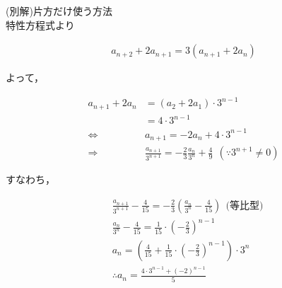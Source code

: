 \documentclass[autodetect-engine,ja=standard, 10.5pt, a4paper, titlepage]{bxjsarticle}
\begin{document}
\begin{enumerate}[1.]
        \baselineskip
        \noindent(別解)片方だけ使う方法 \\
        特性方程式より
          \begin{fleqn}[20pt]
            \begin{align*}
              a_{n+2} + 2a_{n+1} = 3(a_{n+1} + 2a_n)
            \end{align*}
          \end{fleqn}
        よって，
          \begin{fleqn}[20pt]
            \begin{align*}
              a_{n+1} + 2a_n
              &= (a_2 + 2a_1)\cdot 3^{n-1} \\
              &= 4\cdot3^{n-1} \\
              \Leftrightarrow & a_{n+1} = -2a_n + 4\cdot3^{n-1} \\
              \Rightarrow     & \frac{a_{n+1}}{3^{n+1}} = -\frac{2}{3}\frac{a_n}{3^n} + \frac{4}{9} \:\: (\because 3^{n+1} \neq 0)
            \end{align*}
          \end{fleqn}
        すなわち，
          \begin{fleqn}[20pt]
            \begin{align*}
              & \frac{a_{n+1}}{3^{n+1}} - \frac{4}{15} = -\frac{2}{3}\left(\frac{a_n}{3^n} - \frac{4}{15} \right) \:\: \text{(等比型)} \\
              & \frac{a_n}{3^n} - \frac{4}{15} = \frac{1}{15} \cdot \left( -\frac{2}{3} \right)^{n-1} \\
              & a_n = \left( \frac{4}{15} + \frac{1}{15} \cdot \left( -\frac{2}{3} \right)^{n-1} \right) \cdot 3^n \\
              & \therefore a_n = \frac{
                4\cdot3^{n-1} + (-2)^{n-1}
              }{5}
            \end{align*}
          \end{fleqn}



\end{enumerate}
\end{document}
